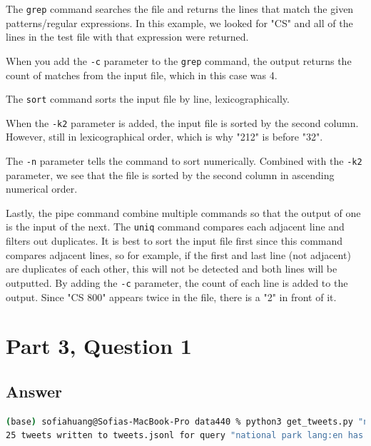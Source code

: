 \documentclass[12pt]{article}
\begin{document}
The \lstinline{grep} command searches the file and returns the lines that match the given patterns/regular expressions. In this example, we looked for "CS" and all of the lines in the test file with that expression were returned.

When you add the \lstinline{-c} parameter to the \lstinline{grep} command, the output returns the count of matches from the input file, which in this case was 4.

The \lstinline{sort} command sorts the input file by line, lexicographically.

When the \lstinline{-k2} parameter is added, the input file is sorted by the second column. However, still in lexicographical order, which is why "212" is before "32".

The \lstinline{-n} parameter tells the command to sort numerically. Combined with the \lstinline{-k2} parameter, we see that the file is sorted by the second column in ascending numerical order.

Lastly, the pipe command combine multiple commands so that the output of one is the input of the next. The \lstinline{uniq} command compares each adjacent line and filters out duplicates. It is best to sort the input file first since this command compares adjacent lines, so for example, if the first and last line (not adjacent) are duplicates of each other, this will not be detected and both lines will be outputted. By adding the \lstinline{-c} parameter, the count of each line is added to the output. Since "CS 800" appears twice in the file, there is a "2" in front of it.

\clearpage

\section*{Part 3, Question 1}

\subsection*{Answer}

\begin{lstlisting}[language=bash, caption=Running get\_tweets.py, label=lst:copy]
(base) sofiahuang@Sofias-MacBook-Pro data440 % python3 get_tweets.py "national park"
25 tweets written to tweets.jsonl for query "national park lang:en has:links -is:retweet"
\end{lstlisting}
\end{document}
